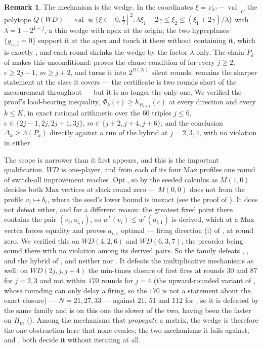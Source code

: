 \documentclass[11pt]{article}
\theoremstyle{plain}
\theoremstyle{definition}
\newtheorem{remark}[theorem]{Remark}
\DeclareMathOperator{\val}{val}
\DeclareMathOperator{\Opt}{Opt}
\begin{document}
\begin{remark}\label{rem:wedge}
The mechanism is the wedge. In the coordinates $\xi=z|_C-\val|_C$ the polytope
$Q(WD)-\val$ is
$\{\xi\in[0,\tfrac12]^2:\lambda\xi_1-2\gamma\le\xi_2\le(\xi_1+2\gamma)/\lambda\}$
with $\lambda=1-2^{1-j}$, a thin wedge with apex at the origin; the two
hyperplanes $\{g_{v_i,\bar i}=0\}$ support it at the apex and touch it there
without containing it, which is exactly , and each round
shrinks the wedge by the factor $\lambda$ only. The chain $P_k$ of  makes this
unconditional:  proves the clause condition of
 for every $j\ge2$, $e\ge2j-1$,
$m\ge j+2$, and  turns it into $2^{\Omega(N)}$
silent rounds.  remains the sharper statement at the
sizes it covers --- the certificate is two rounds short of the measurement
throughout --- but it is no longer the only one. We verified the proof's
load-bearing inequality, $\Phi_k(c)\ge h_{P_{k+1}}(c)$ at every direction
and every $k\le K$, in exact rational arithmetic over the $60$ triples
$j\le6$, $e\in\{2j-1,2j,2j+1,3j\}$, $m\in\{j+2,j+4,j+6\}$, and the
conclusion $\Delta_k\ge\Lambda(P_k)$ directly against a run of the hybrid
at $j=2,3,4$, with no violation in either.

The scope is narrower than it first appears, and this is the important
qualification. $WD$ is one-player, and from each of its four Max profiles one round of
switch-all improvement reaches $\Opt$, so by  the
seeded calculus  as $M(1,0)$ decides both Max vertices at
slack round zero --- $M(0,0)$ does not from the profile $v_i\mapsto b_i$,
where the seed's lower bound is inexact (see the proof of
). It
does not defeat  either, and for a different reason: the
greatest fixed point there contains the pair $(v_i,a_{i,1})$, so
$w^\ast(v_i)\le w^\ast(a_{i,1})$ is derived, which at a Max vertex forces
equality and proves $a_{i,1}$ optimal --- firing direction (i) of
, at round zero. We verified this on $WD(4,2,6)$ and
$WD(6,3,7)$, the preorder being sound there with no violation among its derived
pairs. So the family defeats , ,
 and the hybrid of , and neither
 nor . It defeats the multiplicative mechanisms as well: on
$WD(2j,j,j+4)$ the min-times closure of  first fires at
rounds $30$ and $87$ for $j=2,3$ and not within $170$ rounds for $j=4$
(the upward-rounded variant of , whose rounding
can only delay a firing, so the $170$ is not a statement about the exact
closure) --- $N=21,27,33$ --- against $21$, $51$ and $112$ for
, so it is defeated by the same family and is on
this one the slower of the two, having been the faster on $H_m$
(). Among the mechanisms that \emph{propagate}
a matrix, the wedge is therefore the one obstruction here that none
evades; the two mechanisms it fails against,  and
, both decide it without iterating at all.


\end{remark}
\end{document}
